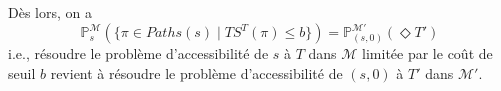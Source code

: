 \documentclass[12pt,a4paper]{report}
\theoremstyle{definition}%
\theoremstyle{remark}
\newtheorem{remark}{Remarque}[chapter]
\newcommand{\ie}{i.e., }
\newcommand{\pr}{\mathbb{P}}
\begin{document}
\begin{itemize}
%
\end{itemize}
 Dès lors, on a \[\pr^\mathcal{M}_s(\{\pi \in Paths(s) \; | \; TS^T(\pi) \leq b \}) = \pr^\mathcal{M'}_{(s, 0)}(\Diamond T')\]
\ie résoudre le problème d'accessibilité de $s$ à $T$ dans $\mathcal{M}$ limitée par le coût de seuil $b$ revient à résoudre le problème d'accessibilité de $(s, 0)$ à $T'$ dans $\mathcal{M'}$. \\
\end{document}
